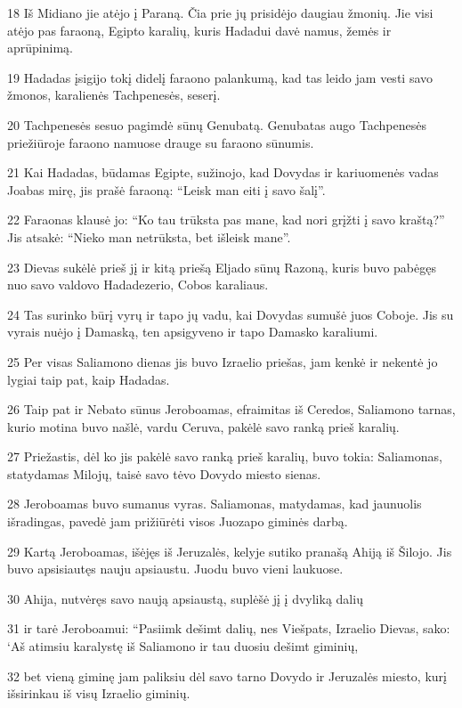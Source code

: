 \par 18 Iš Midiano jie atėjo į Paraną. Čia prie jų prisidėjo daugiau žmonių. Jie visi atėjo pas faraoną, Egipto karalių, kuris Hadadui davė namus, žemės ir aprūpinimą. 
\par 19 Hadadas įsigijo tokį didelį faraono palankumą, kad tas leido jam vesti savo žmonos, karalienės Tachpenesės, seserį. 
\par 20 Tachpenesės sesuo pagimdė sūnų Genubatą. Genubatas augo Tachpenesės priežiūroje faraono namuose drauge su faraono sūnumis. 
\par 21 Kai Hadadas, būdamas Egipte, sužinojo, kad Dovydas ir kariuomenės vadas Joabas mirę, jis prašė faraoną: “Leisk man eiti į savo šalį”. 
\par 22 Faraonas klausė jo: “Ko tau trūksta pas mane, kad nori grįžti į savo kraštą?” Jis atsakė: “Nieko man netrūksta, bet išleisk mane”. 
\par 23 Dievas sukėlė prieš jį ir kitą priešą Eljado sūnų Razoną, kuris buvo pabėgęs nuo savo valdovo Hadadezerio, Cobos karaliaus. 
\par 24 Tas surinko būrį vyrų ir tapo jų vadu, kai Dovydas sumušė juos Coboje. Jis su vyrais nuėjo į Damaską, ten apsigyveno ir tapo Damasko karaliumi. 
\par 25 Per visas Saliamono dienas jis buvo Izraelio priešas, jam kenkė ir nekentė jo lygiai taip pat, kaip Hadadas. 
\par 26 Taip pat ir Nebato sūnus Jeroboamas, efraimitas iš Ceredos, Saliamono tarnas, kurio motina buvo našlė, vardu Ceruva, pakėlė savo ranką prieš karalių. 
\par 27 Priežastis, dėl ko jis pakėlė savo ranką prieš karalių, buvo tokia: Saliamonas, statydamas Milojų, taisė savo tėvo Dovydo miesto sienas. 
\par 28 Jeroboamas buvo sumanus vyras. Saliamonas, matydamas, kad jaunuolis išradingas, pavedė jam prižiūrėti visos Juozapo giminės darbą. 
\par 29 Kartą Jeroboamas, išėjęs iš Jeruzalės, kelyje sutiko pranašą Ahiją iš Šilojo. Jis buvo apsisiautęs nauju apsiaustu. Juodu buvo vieni laukuose. 
\par 30 Ahija, nutvėręs savo naują apsiaustą, suplėšė jį į dvyliką dalių 
\par 31 ir tarė Jeroboamui: “Pasiimk dešimt dalių, nes Viešpats, Izraelio Dievas, sako: ‘Aš atimsiu karalystę iš Saliamono ir tau duosiu dešimt giminių, 
\par 32 bet vieną giminę jam paliksiu dėl savo tarno Dovydo ir Jeruzalės miesto, kurį išsirinkau iš visų Izraelio giminių. 

